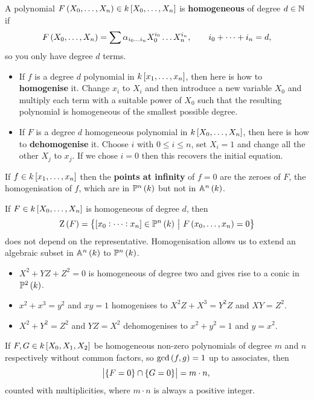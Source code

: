 \begin{definition}
A polynomial $ F\br{X_0, \dots, X_n} \in k\sbr{X_0, \dots, X_n} $ is \textbf{homogeneous} of degree $ d \in \mathbb{N} $ if
$$ F\br{X_0, \dots, X_n} = \sum \alpha_{i_0 \dots i_n}X_0^{i_0} \dots X_n^{i_n}, \qquad i_0 + \dots + i_n = d, $$
so you only have degree $ d $ terms.
\begin{itemize}
\item If $ f $ is a degree $ d $ polynomial in $ k\sbr{x_1, \dots, x_n} $, then here is how to \textbf{homogenise} it. Change $ x_i $ to $ X_i $ and then introduce a new variable $ X_0 $ and multiply each term with a suitable power of $ X_0 $ such that the resulting polynomial is homogeneous of the smallest possible degree.
\item If $ F $ is a degree $ d $ homogeneous polynomial in $ k\sbr{X_0, \dots, X_n} $, then here is how to \textbf{dehomogenise} it. Choose $ i $ with $ 0 \le i \le n $, set $ X_i = 1 $ and change all the other $ X_j $ to $ x_j $. If we chose $ i = 0 $ then this recovers the initial equation.
\end{itemize}
If $ f \in k\sbr{x_1, \dots, x_n} $ then the \textbf{points at infinity} of $ f = 0 $ are the zeroes of $ F $, the homogenisation of $ f $, which are in $ \PP^n\br{k} $ but not in $ \AA^n\br{k} $.
\end{definition}

If $ F \in k\sbr{X_0, \dots, X_n} $ is homogeneous of degree $ d $, then
$$ \Z\br{F} = \cbr{\sbr{x_0 : \dots : x_n} \in \PP^n\br{k} \st F\br{x_0, \dots, x_n} = 0} $$
does not depend on the representative. Homogenisation allows us to extend an algebraic subset in $ \AA^n\br{k} $ to $ \PP^n\br{k} $.

\begin{example*}
\hfill
\begin{itemize}
\item $ X^2 + YZ + Z^2 = 0 $ is homogeneous of degree two and gives rise to a conic in $ \PP^2\br{k} $.
\item $ x^2 + x^3 = y^2 $ and $ xy = 1 $ homogenises to $ X^2Z + X^3 = Y^2Z $ and $ XY = Z^2 $.
\item $ X^2 + Y^2 = Z^2 $ and $ YZ = X^2 $ dehomogenises to $ x^2 + y^2 = 1 $ and $ y = x^2 $.
\end{itemize}
\end{example*}

\pagebreak

\begin{theorem}
If $ F, G \in k\sbr{X_0, X_1, X_2} $ be homogeneous non-zero polynomials of degree $ m $ and $ n $ respectively without common factors, so $ \gcd\br{f, g} = 1 $ up to associates, then
$$ \abs{\cbr{F = 0} \cap \cbr{G = 0}} = m \cdot n, $$
counted with multiplicities, where $ m \cdot n $ is always a positive integer.
\end{theorem}

